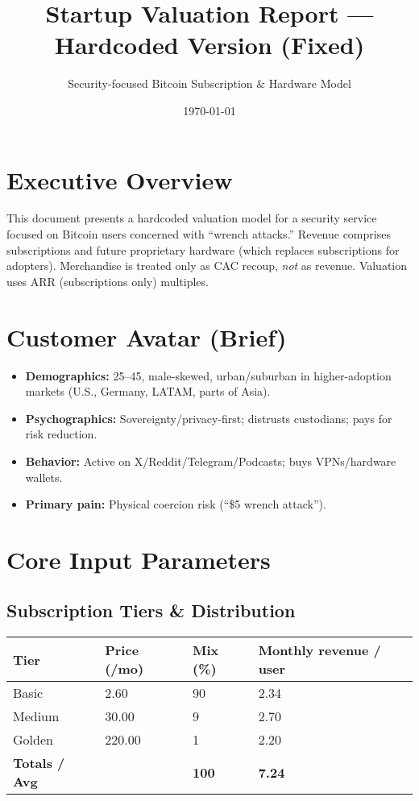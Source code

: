 \documentclass[11pt]{article}
\begin{document}
\title{Startup Valuation Report — Hardcoded Version (Fixed)}
\author{Security-focused Bitcoin Subscription \& Hardware Model}
\date{\today}
\maketitle

\section*{Executive Overview}
This document presents a hardcoded valuation model for a security service focused on Bitcoin users concerned with ``wrench attacks.'' Revenue comprises subscriptions and future proprietary hardware (which replaces subscriptions for adopters). Merchandise is treated only as CAC recoup, \emph{not} as revenue. Valuation uses ARR (subscriptions only) multiples.

\section{Customer Avatar (Brief)}
\begin{itemize}
  \item \textbf{Demographics:} 25--45, male-skewed, urban/suburban in higher-adoption markets (U.S., Germany, LATAM, parts of Asia).
  \item \textbf{Psychographics:} Sovereignty/privacy-first; distrusts custodians; pays for risk reduction.
  \item \textbf{Behavior:} Active on X/Reddit/Telegram/Podcasts; buys VPNs/hardware wallets.
  \item \textbf{Primary pain:} Physical coercion risk (``\$5 wrench attack'').
\end{itemize}

\section{Core Input Parameters}

\subsection*{Subscription Tiers \& Distribution}
\centering
\begin{tabularx}{\linewidth}{l Y Y Y}
\toprule
Tier & Price (/mo) & Mix (\%) & Monthly revenue / user \\\midrule
Basic   & 2.60  & 90 & 2.34 \\
Medium  & 30.00 & 9  & 2.70 \\
Golden  & 220.00& 1  & 2.20 \\\midrule
\textbf{Totals / Avg} &  & \textbf{100} & \textbf{7.24} \\
\bottomrule
\end{tabularx}
\end{document}
